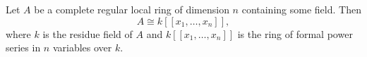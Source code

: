 Let $A$ be a complete regular local ring of dimension $n$ containing some field. Then
$$A \cong k[[x_1, \ldots, x_n]],$$
where $k$ is the residue field of $A$ and $k[[x_1, \ldots, x_n]]$ is the ring of formal power series in $n$ variables over $k$.
